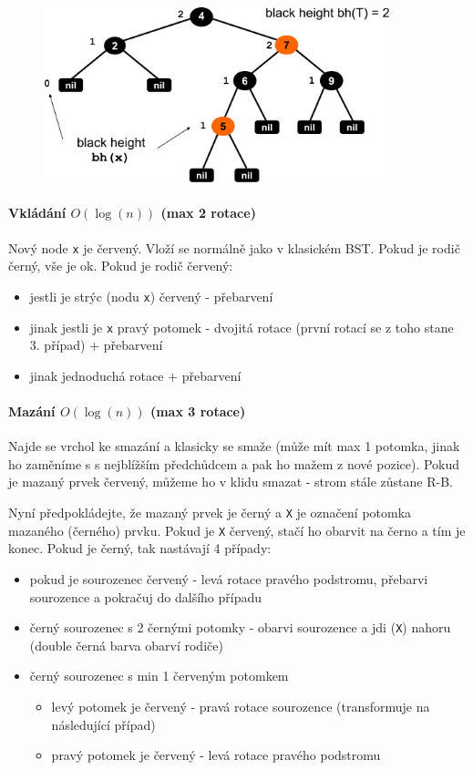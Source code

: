 \begin{figure}[h]
    \begin{center}
        \includegraphics[width=100mm]{spolecne/03/images/red-black}
    \end{center}
\end{figure}

\paragraph{Vkládání $O(\log(n))$ (max 2 rotace)} Nový node \texttt{x} je červený. Vloží se normálně jako v klasickém BST. Pokud je rodič černý, vše je ok. Pokud je rodič červený:

\begin{itemize}
\item jestli je strýc (nodu \texttt{x}) červený - přebarvení
\item jinak jestli je \texttt{x} pravý potomek  - dvojitá rotace (první rotací se z toho stane 3. případ) + přebarvení
\item jinak jednoduchá rotace + přebarvení
\end{itemize}

\paragraph{Mazání $O(\log(n))$ (max 3 rotace)} Najde se vrchol ke smazání a klasicky se smaže (může mít max 1 potomka, jinak ho zaměníme s s nejblížším předchůdcem a pak ho mažem z nové pozice). Pokud je mazaný prvek červený, můžeme ho v klidu smazat - strom stále zůstane R-B.

Nyní předpokládejte, že mazaný prvek je černý a \texttt{X} je označení potomka mazaného (černého) prvku. Pokud je \texttt{X} červený, stačí ho obarvit na černo a tím je konec. Pokud je černý, tak nastávají 4 případy:

\begin{itemize}
\item pokud je sourozenec červený - levá rotace pravého podstromu, přebarvi sourozence a pokračuj do dalšího případu
\item černý sourozenec s 2 černými potomky - obarvi sourozence a jdi (\texttt{X}) nahoru (double černá barva obarví rodiče)
\item černý sourozenec s min 1 červeným potomkem
\begin{itemize}
\item levý potomek je červený - pravá rotace sourozence (transformuje na následující případ)
\item pravý potomek je červený - levá rotace pravého podstromu
\end{itemize}
\end{itemize}


